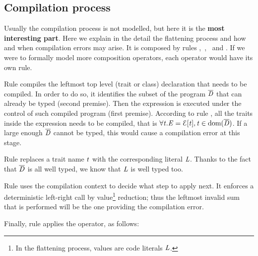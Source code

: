 \subsection{Compilation process}

Usually the compilation process is not modelled, but here it is the \textbf{most interesting part}.
Here we explain in the detail the flattening process and how and when compilation errors may arise.
It is composed by rules ,\ ,\  and .
If we were to formally model more composition operators, each operator would have its own  rule.

Rule 
compiles the leftmost top level (trait or class) declaration that needs to be compiled.
In order to do so,
it identifies the subset of the program $\overline{\mathit{D}}$ that can already be typed (second premise).
Then the expression is executed under the control of such compiled program (first premise).
According to rule , all the traits inside the expression needs to
be compiled, that is $\forall\mathit{t}. \mathit{E}={\cal{E}}[\mathit{t}], \mathit{t}\in\text{dom}(\overline{\mathit{D}})$.
If a large enough $\overline{\mathit{D}}$ cannot be typed, this would cause a compilation error
at this stage.

Rule 
replaces a trait name $\mathit{t}$ with the corresponding literal $\mathit{L}$.
Thanks to the fact that $\overline{\mathit{D}}$ is all well typed, we know that $\mathit{L}$ is well typed too.

Rule 
uses the compilation context to decide what step to apply next.
It enforces a deterministic left-right call by value\footnote{
In the flattening process, values are code literals $\mathit{L}$.} reduction;
thus the leftmost invalid sum that is performed will be the one providing the compilation error.

Finally, rule 
applies the operator, as follows:

